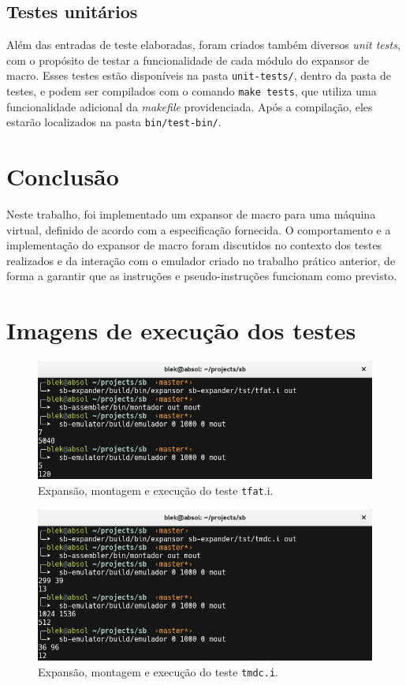 \documentclass[12pt,a4paper]{article}
\numberwithin{equation}{section}
\begin{document}
\subsection{Testes unitários}

Além das entradas de teste elaboradas, foram criados também diversos \emph{unit tests}, com o propósito de testar a funcionalidade de cada módulo do expansor de macro. Esses testes estão disponíveis na pasta \verb|unit-tests/|, dentro da pasta de testes, e podem ser compilados com o comando \verb|make tests|, que utiliza uma funcionalidade adicional da \emph{makefile} providenciada. Após a compilação, eles estarão localizados na pasta \verb|bin/test-bin/|.

\section{Conclusão}

Neste trabalho, foi implementado um expansor de macro para uma máquina virtual, definido de acordo com a especificação fornecida. O comportamento e a implementação do expansor de macro foram discutidos no contexto dos testes realizados e da interação com o emulador criado no trabalho prático anterior, de forma a garantir que as instruções e pseudo-instruções funcionam como previsto.

\appendix

\section{Imagens de execução dos testes}

\begin{figure}[h]
    \includegraphics[scale=0.7]{imagens/tfat.png}
    \centering
    \caption{Expansão, montagem e execução do teste \verb|tfat|.i.}
\end{figure}

\begin{figure}[h]
    \includegraphics[scale=0.7]{imagens/tmdc.png}
    \centering
    \caption{Expansão, montagem e execução do teste \verb|tmdc.i|.}
\end{figure}
\end{document}
